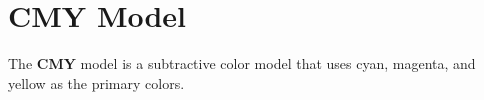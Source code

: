 \section{CMY Model}

  \begin{definition}
    The \textbf{CMY} model is a subtractive color model that uses cyan, magenta, and yellow as the primary colors. 
  \end{definition}


